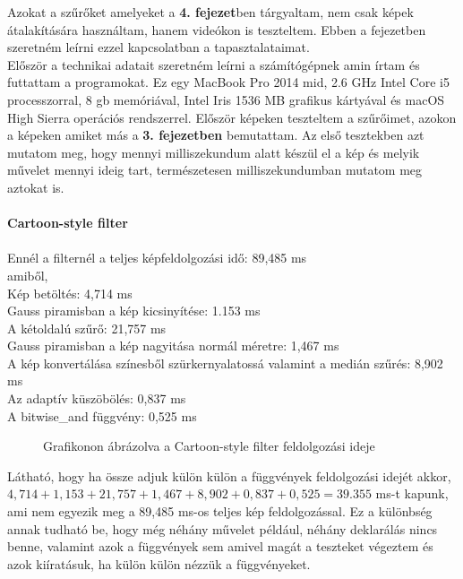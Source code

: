 
Azokat a szűrőket amelyeket a \textbf{4. fejezet}ben tárgyaltam, nem csak képek átalakítására használtam, hanem videókon is teszteltem. Ebben a fejezetben szeretném leírni ezzel kapcsolatban a tapasztalataimat. 
\\

\noindent Először a technikai adatait szeretném leírni a számítógépnek amin írtam és futtattam a programokat. Ez egy MacBook Pro  2014 mid, 2.6 GHz Intel Core i5 processzorral, 8 gb memóriával, Intel Iris 1536 MB grafikus kártyával és macOS High Sierra operációs rendszerrel.
Először képeken teszteltem a szűrőimet, azokon a képeken amiket más a \textbf{3. fejezetben} bemutattam. Az első tesztekben azt mutatom meg, hogy mennyi milliszekundum alatt készül el a kép és melyik művelet mennyi ideig tart, természetesen milliszekundumban mutatom meg aztokat is.\\\\
\textbf{Cartoon-style filter}\\\\
Ennél a filternél a teljes képfeldolgozási idő: 89,485 ms\\
amiből,\\
Kép betöltés: 4,714 ms\\
Gauss piramisban a kép kicsinyítése: 1.153 ms\\
A kétoldalú szűrő: 21,757 ms\\
Gauss piramisban a kép nagyitása normál méretre: 1,467 ms\\
A kép konvertálása színesből szürkernyalatossá valamint a medián szűrés: 8,902 ms\\
Az adaptív küszöbölés: 0,837 ms\\
A bitwise\_and függvény: 0,525 ms
\newpage
\begin{figure}[ht]
\centering
{}
\caption{Grafikonon ábrázolva a Cartoon-style filter feldolgozási ideje} 
\label{fig: graf1}
\end{figure}
\noindent Látható, hogy ha össze adjuk külön külön a függvények feldolgozási idejét akkor, $4,714+1,153+21,757+1,467+8,902+0,837+0,525=39.355$ ms-t kapunk, ami nem egyezik meg a 89,485 ms-os teljes kép feldolgozással. Ez a különbség annak tudható be, hogy még néhány művelet például, néhány deklarálás nincs benne, valamint azok a függvények sem amivel magát a teszteket végeztem és azok kiíratásuk, ha külön külön nézzük a függvényeket. \\ \\
